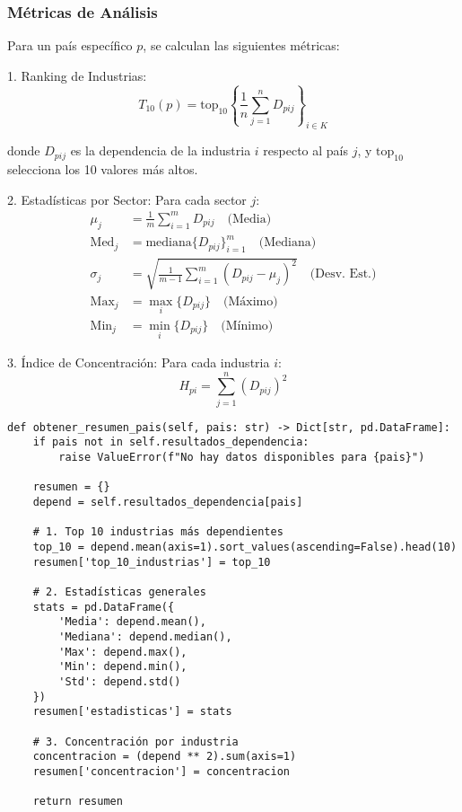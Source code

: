 \documentclass[11pt,a4paper]{article}
\begin{document}
\subsubsection{Métricas de Análisis}

Para un país específico $p$, se calculan las siguientes métricas:

1. Ranking de Industrias:
\begin{equation}
T_{10}(p) = \text{top}_{10}\left\{\frac{1}{n}\sum_{j=1}^n D_{pij}\right\}_{i \in K}
\end{equation}

donde $D_{pij}$ es la dependencia de la industria $i$ respecto al país $j$, y $\text{top}_{10}$ selecciona los 10 valores más altos.

2. Estadísticas por Sector:
Para cada sector $j$:
\begin{align}
\mu_j &= \frac{1}{m}\sum_{i=1}^m D_{pij} \quad \text{(Media)} \\
\text{Med}_j &= \text{mediana}\{D_{pij}\}_{i=1}^m \quad \text{(Mediana)} \\
\sigma_j &= \sqrt{\frac{1}{m-1}\sum_{i=1}^m (D_{pij} - \mu_j)^2} \quad \text{(Desv. Est.)} \\
\text{Max}_j &= \max_i\{D_{pij}\} \quad \text{(Máximo)} \\
\text{Min}_j &= \min_i\{D_{pij}\} \quad \text{(Mínimo)}
\end{align}

3. Índice de Concentración:
Para cada industria $i$:
\begin{equation}
H_{pi} = \sum_{j=1}^n (D_{pij})^2
\end{equation}

\begin{tcolorbox}[colback=codebackground,title=Implementación del Método]
\begin{lstlisting}
def obtener_resumen_pais(self, pais: str) -> Dict[str, pd.DataFrame]:
    if pais not in self.resultados_dependencia:
        raise ValueError(f"No hay datos disponibles para {pais}")
        
    resumen = {}
    depend = self.resultados_dependencia[pais]
    
    # 1. Top 10 industrias más dependientes
    top_10 = depend.mean(axis=1).sort_values(ascending=False).head(10)
    resumen['top_10_industrias'] = top_10
    
    # 2. Estadísticas generales
    stats = pd.DataFrame({
        'Media': depend.mean(),
        'Mediana': depend.median(),
        'Max': depend.max(),
        'Min': depend.min(),
        'Std': depend.std()
    })
    resumen['estadisticas'] = stats
    
    # 3. Concentración por industria
    concentracion = (depend ** 2).sum(axis=1)
    resumen['concentracion'] = concentracion
    
    return resumen
\end{lstlisting}
\end{tcolorbox}
\end{document}
